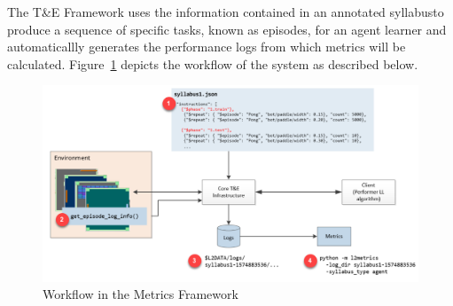 The T\&E Framework uses the information contained in an annotated syllabusto produce a sequence of specific tasks, known as episodes, for an agent learner and automaticallly generates the performance logs from which metrics will be calculated. Figure~\ref{fig:workflow} depicts the workflow of the system as described below.\\[0.2in]

\begin{figure}[h]
	\centering
	\includegraphics[width=0.9\columnwidth]{sections/figs/metrics_overview_1.png}
	\caption{Workflow in the Metrics Framework}
	\label{fig:workflow}
\end{figure}

